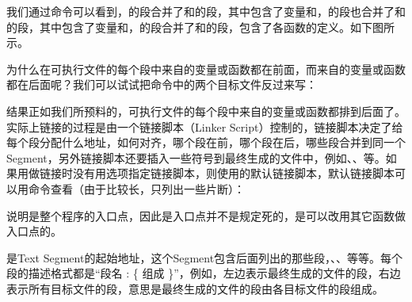 我们通过命令可以看到，的段合并了和的段，其中包含了变量和，的段也合并了和的段，其中包含了变量和，的段合并了和的段，包含了各函数的定义。如下图所示。




为什么在可执行文件的每个段中来自的变量或函数都在前面，而来自的变量或函数都在后面呢？我们可以试试把命令中的两个目标文件反过来写：




结果正如我们所预料的，可执行文件的每个段中来自的变量或函数都排到后面了。实际上链接的过程是由一个链接脚本（Linker Script）控制的，链接脚本决定了给每个段分配什么地址，如何对齐，哪个段在前，哪个段在后，哪些段合并到同一个Segment，另外链接脚本还要插入一些符号到最终生成的文件中，例如、、等。如果用做链接时没有用选项指定链接脚本，则使用的默认链接脚本，默认链接脚本可以用命令查看（由于比较长，只列出一些片断）：




说明是整个程序的入口点，因此是入口点并不是规定死的，是可以改用其它函数做入口点的。



是Text Segment的起始地址，这个Segment包含后面列出的那些段，、、等等。每个段的描述格式都是“段名 : \{ 组成 \}”，例如，左边表示最终生成的文件的段，右边表示所有目标文件的段，意思是最终生成的文件的段由各目标文件的段组成。



